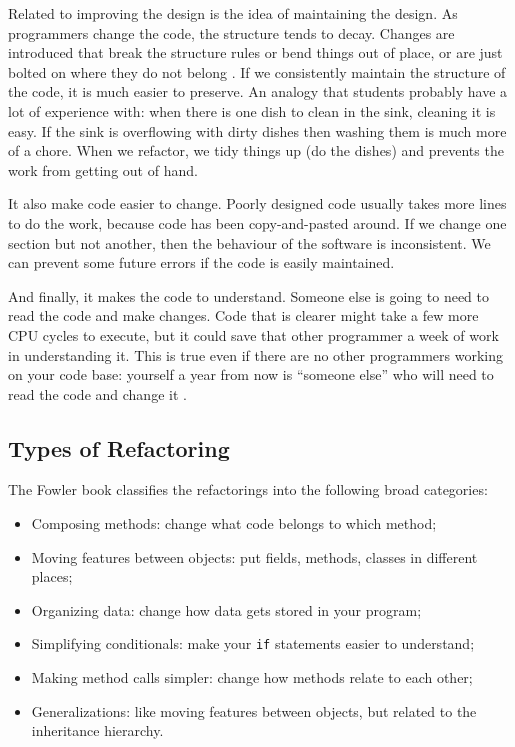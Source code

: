 Related to improving the design is the idea of maintaining the design. As programmers change the code, the structure tends to decay. Changes are introduced that break the structure rules or bend things out of place, or are just bolted on where they do not belong \cite{sourcemaking}. If we consistently maintain the structure of the code, it is much easier to preserve. An analogy that students probably have a lot of experience with: when there is one dish to clean in the sink, cleaning it is easy. If the sink is overflowing with dirty dishes then washing them is much more of a chore. When we refactor, we tidy things up (do the dishes) and prevents the work from getting out of hand.

It also make code easier to change. Poorly designed code usually takes more lines to do the work, because code has been copy-and-pasted around. If we change one section but not another, then the behaviour of the software is inconsistent. We can prevent some future errors if the code is easily maintained.

And finally, it makes the code to understand. Someone else is going to need to read the code and make changes. Code that is clearer might take a few more CPU cycles to execute, but it could save that other programmer a week of work in understanding it. This is true even if there are no other programmers working on your code base: yourself a year from now is ``someone else'' who will need to read the code and change it \cite{sourcemaking}. 


\subsection*{Types of Refactoring} The Fowler book classifies the
refactorings into the following broad categories:

\begin{itemize}
\item Composing methods: change what code belongs to which method;
\item Moving features between objects: put fields, methods, classes in
different places;
\item Organizing data: change how data gets stored in your program;
\item Simplifying conditionals: make your {\tt if} statements easier
to understand;
\item Making method calls simpler: change how methods relate to each other;
\item Generalizations: like moving features between objects, but related
to the inheritance hierarchy.
\end{itemize}

